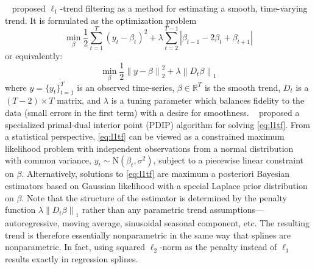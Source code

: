 \documentclass[letterpaper]{article} %
\newcommand{\citet}[1]
{\citeauthor{#1} ~\shortcite{#1}}
\newcommand{\norm}[1]{\left\lVert #1 \right\rVert}
\begin{document}
\citet{KimKoh2009} proposed $\ell_1$-trend filtering as a
method for estimating a smooth, time-varying trend. It is formulated
as the optimization problem 
$$
\min_{\beta} \frac{1}{2} \sum_{t=1}^{T} (y_t-\beta_t)^2+\lambda
\sum_{t=2}^{T-1} \left|\beta_{t-1}-2\beta_{t}+\beta_{t+1}\right| 
$$
or equivalently:
\begin{equation}
\min_{\beta} \frac{1}{2} \norm{ y-\beta }_2^2+\lambda \norm{ D_t \beta}_1
\label{eq:l1tf}
\end{equation}
 where $y=\{y_t\}_{t=1}^T$ is an observed time-series, $\beta\in \mathbb{R}^T$ is the smooth trend,
 $D_t$ is a $(T-2)\times T$ matrix, and $\lambda$ is a tuning parameter
 which balances fidelity to the data (small errors in the first term)
 with a desire for smoothness.  
\citet{KimKoh2009} proposed a specialized primal-dual
interior point (PDIP) algorithm for solving \eqref{eq:l1tf}. From a
statistical perspective, \eqref{eq:l1tf} can be viewed as a constrained maximum
likelihood problem with independent observations from a normal
distribution with common variance, $y_t \sim \mbox{N}(\beta_t,
\sigma^2)$, subject to a piecewise linear constraint on
$\beta$. Alternatively, solutions to \eqref{eq:l1tf} are %
maximum a posteriori Bayesian estimators based on Gaussian likelihood
with a special Laplace prior distribution on $\beta$. Note that the
structure of the estimator is determined by the penalty function
$\lambda\norm{D_t\beta}_1$ rather than any parametric trend
assumptions---autoregressive, moving average, sinusoidal seasonal
component, etc. The resulting trend is therefore essentially
nonparametric in the same way that splines are nonparametric. In fact,
using squared $\ell_2$-norm as the penalty instead of $\ell_1$ results exactly in
regression splines.
\end{document}
